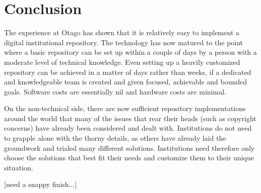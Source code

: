\documentclass[12pt,pdftex,a4paper,titlepage]{article}
\begin{document}
\section{Conclusion}

The experience at Otago has shown that it is relatively easy to implement a digital institutional repository. The technology has now matured to the point where a basic repository can be set up within a couple of days by a person with a moderate level of technical knowledge. Even setting up a heavily customized repository can be achieved in a matter of days rather than weeks, if a dedicated and knowledgeable team is created and given focused, achievable and bounded goals. Software costs are essentially nil and hardware costs are minimal.

On the non-technical side, there are now sufficient repository implementations around the world that many of the issues that rear their heads (such as copyright concerns) have already been considered and dealt with. Institutions do not need to grapple alone with the thorny details, as others have already laid the groundwork and trialed many different solutions. Institutions need therefore only choose the solutions that best fit their needs and customize them to their unique situation.

[need a snappy finish...]



\end{document}
